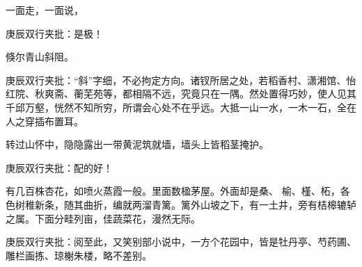 \begin{parag}


    一面走，一面说，\begin{note}庚辰双行夹批：是极！\end{note}倏尔青山斜阻。\begin{note}庚辰双行夹批：“斜”字细，不必拘定方向。诸钗所居之处，若稻香村、潇湘馆、怡红院、秋爽斋、蘅芜苑等，都相隔不远，究竟只在一隅。然处置得巧妙，使人见其千邱万壑，恍然不知所穷，所谓会心处不在乎远。大抵一山一水，一木一石，全在人之穿插布置耳。\end{note}转过山怀中，隐隐露出一带黄泥筑就墙，墙头上皆稻茎掩护。\begin{note}庚辰双行夹批：配的好！\end{note}有几百株杏花，如喷火蒸霞一般。里面数楹茅屋。外面却是桑、 榆、槿、柘，各色树稚新条，随其曲折，编就两溜青篱。篱外山坡之下，有一土井，旁有桔槔辘轳之属。下面分畦列亩，佳蔬菜花，漫然无际。\begin{note}庚辰双行夹批：阅至此，又笑别部小说中，一方个花园中，皆是牡丹亭、芍药圃、雕栏画拣、琼榭朱楼，略不差别。\end{note}
\end{parag}


